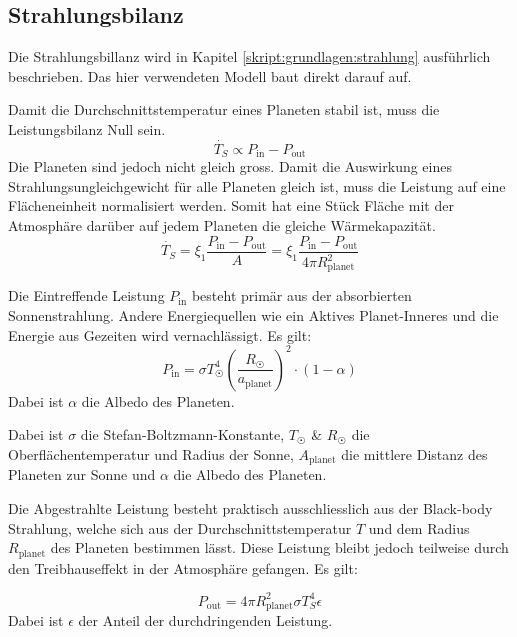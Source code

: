\begin{refsection}
\subsection{Strahlungsbilanz}
Die Strahlungsbillanz wird in Kapitel \ref{skript:grundlagen:strahlung} ausführlich beschrieben. Das hier verwendeten Modell baut direkt darauf auf.

Damit die Durchschnittstemperatur eines Planeten stabil ist, muss die Leistungsbilanz Null sein.
\begin{equation}
\dot{T_S} \propto P_{\text{in}} - P_{\text{out}}
\end{equation}
Die Planeten sind jedoch nicht gleich gross. Damit die Auswirkung eines Strahlungsungleichgewicht für alle Planeten gleich ist, muss die Leistung auf eine Flächeneinheit normalisiert werden. Somit hat eine Stück Fläche mit der Atmosphäre darüber auf jedem Planeten die gleiche Wärmekapazität.
\begin{equation}
\dot{T_S} = \xi_1 \frac{P_{\text{in}} - P_{\text{out}}}{A} = \xi_1 \frac{P_{\text{in}} - P_{\text{out}}}{4 \pi R_{\text{planet}}^2}
\end{equation}

Die Eintreffende Leistung $P_{\text{in}}$ besteht primär aus der absorbierten Sonnenstrahlung. Andere Energiequellen wie ein Aktives Planet-Inneres und die Energie aus Gezeiten wird vernachlässigt. Es gilt:
\begin{equation}
P_{\text{in}} = \sigma T_{\astrosun}^4 \left( \frac{R_{\astrosun}}{a_{\text{planet}}} \right) ^2 \cdot (1-\alpha)
\end{equation}
Dabei ist $\alpha$ die Albedo des Planeten.

Dabei ist $\sigma$ die Stefan-Boltzmann-Konstante, $T_{\astrosun}$ \& $R_{\astrosun}$ die Oberflächentemperatur und Radius der Sonne, $ A_{\text{planet}}$ die mittlere Distanz des Planeten zur Sonne und $\alpha$ die Albedo des Planeten.

Die Abgestrahlte Leistung besteht praktisch ausschliesslich aus der Black-body Strahlung, welche sich aus der Durchschnittstemperatur $T$ und dem Radius $R_{\text{planet}}$ des Planeten bestimmen lässt. Diese Leistung bleibt jedoch teilweise durch den Treibhauseffekt in der Atmosphäre gefangen. Es gilt: 

\begin{equation}
P_{\text{out}} = 4 \pi R_{\text{planet}}^2 \sigma T_{S}^4 \epsilon
\end{equation}
Dabei ist $\epsilon$ der Anteil der durchdringenden Leistung.




\end{refsection}
